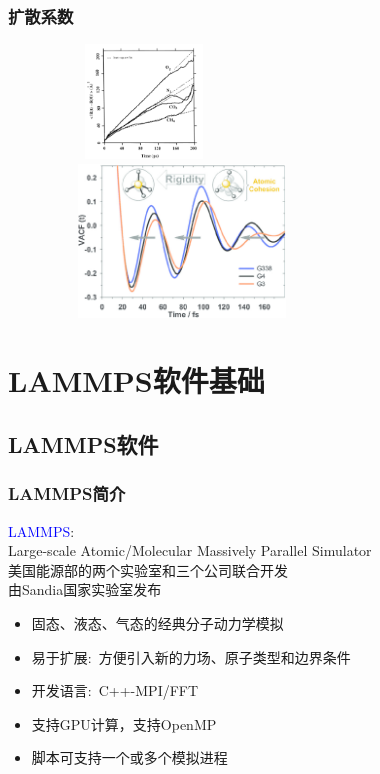 \frame
{
	\frametitle{扩散系数}
\begin{figure}[h!]
\centering
\vspace*{-0.2in}
\includegraphics[height=1.2in,width=2.0in,viewport=0 0 350 300,clip]{Figures/MSD_O2-N2-CO2-CH4.png}\\
\includegraphics[height=1.6in,width=2.8in,viewport=0 0 230 160,clip]{Figures/The-velocity-autocorrelation-function-VACF-of-the-Al-atoms-showing-the-increase-of-rigidity of the local Al-coordination-for-G3-G4-and-G338-glasses.png}
\label{MSD-VACF}
\end{figure}
}

\section{{\rm LAMMPS}软件基础}
\subsection{{\rm LAMMPS}软件}
\frame
{
	\frametitle{\textrm{LAMMPS}简介}
	\textcolor{blue}{\textrm{LAMMPS}}:\\
	\textrm{Large-scale Atomic/Molecular Massively Parallel Simulator}\\
	美国能源部的两个实验室和三个公司联合开发\\
	由\textrm{Sandia}国家实验室发布
	\begin{itemize}
			\setlength{\itemsep}{10pt}
		\item 固态、液态、气态的经典分子动力学模拟
		\item 易于扩展:~方便引入新的力场、原子类型和边界条件
		\item 开发语言:~\textrm{C++-MPI/FFT}
		\item 支持\textrm{GPU}计算，支持\textrm{OpenMP}
		\item 脚本可支持一个或多个模拟进程
	\end{itemize}
}

